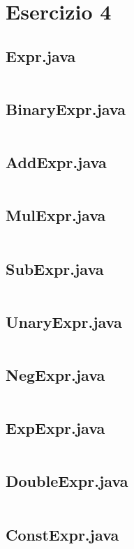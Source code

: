 \section*{Esercizio 4}

\subsection*{Expr.java}
\inputminted{java}{tex/src/4/Expr.java}

\subsection*{BinaryExpr.java}
\inputminted{java}{tex/src/4/BinaryExpr.java}

\subsection*{AddExpr.java}
\inputminted{java}{tex/src/4/AddExpr.java}

\subsection*{MulExpr.java}
\inputminted{java}{tex/src/4/MulExpr.java}

\subsection*{SubExpr.java}
\inputminted{java}{tex/src/4/SubExpr.java}

\subsection*{UnaryExpr.java}
\inputminted{java}{tex/src/4/UnaryExpr.java}

\subsection*{NegExpr.java}
\inputminted{java}{tex/src/4/NegExpr.java}

\subsection*{ExpExpr.java}
\inputminted{java}{tex/src/4/ExpExpr.java}

\subsection*{DoubleExpr.java}
\inputminted{java}{tex/src/4/DoubleExpr.java}

\subsection*{ConstExpr.java}
\inputminted{java}{tex/src/4/ConstExpr.java}
